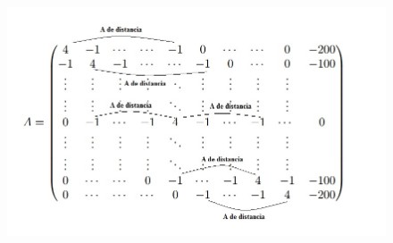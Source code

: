         \begin{figure}[H]
    \centering
    \includegraphics[scale=0.7]{graphs/matriz.jpg}
      \end{figure}
    
    

